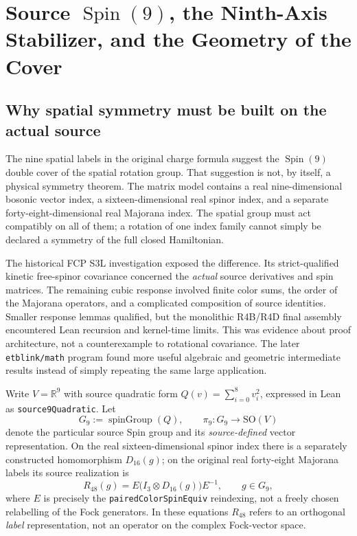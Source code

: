 \chapter[Source Spin(9) and the Ninth-Axis Stabilizer]{Source $\operatorname{Spin}(9)$, the Ninth-Axis Stabilizer, and the Geometry of the Cover}
\label{ch:spin-geometry}

\section{Why spatial symmetry must be built on the actual source}
The nine spatial labels in the original charge formula suggest the
$\operatorname{Spin}(9)$ double cover of the spatial rotation group. That
suggestion is not, by itself, a physical symmetry theorem. The matrix model
contains a real nine-dimensional bosonic vector index, a sixteen-dimensional
real spinor index, and a separate forty-eight-dimensional real Majorana
index. The spatial group must act compatibly on all of them; a rotation of
one index family cannot simply be declared a symmetry of the full closed
Hamiltonian.

The historical FCP S3L investigation exposed the difference. Its
strict-qualified kinetic free-spinor covariance concerned the \emph{actual}
source derivatives and spin matrices. The remaining cubic response involved
finite color sums, the order of the Majorana operators, and a complicated
composition of source identities. Smaller response lemmas qualified, but
the monolithic R4B/R4D final assembly encountered Lean recursion and
kernel-time limits. This was evidence about proof architecture, not a
counterexample to rotational covariance. The later \texttt{etblink/math}
program found more useful algebraic and geometric intermediate results
instead of simply repeating the same large application.

\begin{definition}
Write $V=\mathbb R^9$ with source quadratic form
$Q(v)=\sum_{i=0}^{8}v_i^2$, expressed in Lean as
\texttt{source9Quadratic}. Let
\[
 G_9:=\operatorname{spinGroup}(Q),\qquad
 \pi_9:G_9\longrightarrow \mathrm{SO}(V)
\]
denote the particular source Spin group and its \emph{source-defined}
vector representation. On the real sixteen-dimensional spinor index
there is a separately constructed homomorphism $D_{16}(g)$; on the
original real forty-eight Majorana labels its source realization is
\begin{equation}\label{eq:spin48-label-action}
 R_{48}(g)=E\bigl(I_3\otimes D_{16}(g)\bigr)E^{-1},
 \qquad g\in G_9,
\end{equation}
where $E$ is precisely the \texttt{pairedColorSpinEquiv} reindexing,
not a freely chosen relabelling of the Fock generators. In these equations
$R_{48}$ refers to an orthogonal \emph{label} representation, not
an operator on the complex Fock-vector space.
\end{definition}

